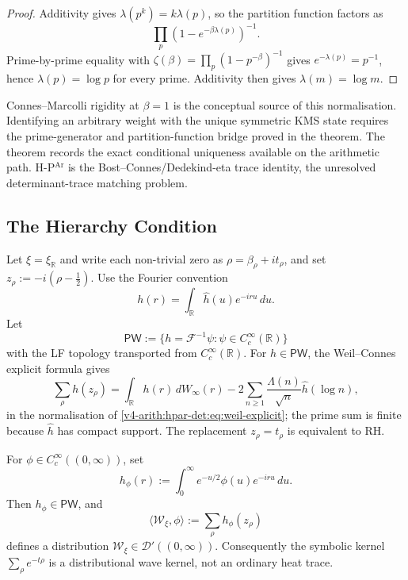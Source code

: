 \begin{proof}
Additivity gives \(\lambda(p^{k})=k\lambda(p)\), so the partition
function factors as
\[
 \prod_{p}(1-e^{-\beta\lambda(p)})^{-1}.
\]
Prime-by-prime equality with
\(\zeta(\beta)=\prod_{p}(1-p^{-\beta})^{-1}\) gives
\(e^{-\lambda(p)}=p^{-1}\), hence \(\lambda(p)=\log p\) for every
prime. Additivity then gives \(\lambda(m)=\log m\).
\end{proof}

\begin{remark}
\label{v4-arith:hpar-det:rem:conditional-uniqueness}
Connes--Marcolli rigidity at \(\beta=1\) is the conceptual source of
this normalisation. Identifying an arbitrary weight with the unique
symmetric KMS state requires the prime-generator and partition-function
bridge proved in the theorem. The theorem records the exact conditional
uniqueness available on the arithmetic path. H-P\(^{\mathrm{Ar}}\) is the
Bost--Connes/Dedekind-eta trace identity, the unresolved
determinant-trace matching problem.
\end{remark}

\subsection{The Hierarchy Condition}
\label{v4-arith:hpar-det:hierarchy}

\begin{lemma}
\label{v4-arith:hpar-det:lem:PW-wave-regularisation}
Let \(\xi=\xi_{\mathbb R}\) and write each
non-trivial zero as \(\rho=\beta_{\rho}+it_{\rho}\), and set
\(z_{\rho}:=-i(\rho-\tfrac12)\). Use the Fourier
convention
\[
h(r)=\int_{\mathbb R}\widehat h(u)e^{-iru}\,du .
\]
Let
\[
\mathsf{PW}:=\{h=\mathcal F^{-1}\psi:\psi\in C_c^\infty(\mathbb R)\}
\]
with the LF topology transported from \(C_c^\infty(\mathbb R)\). For
\(h\in\mathsf{PW}\), the Weil--Connes explicit formula gives
\begin{equation}
\label{v4-arith:hpar-det:eq:PW-weil}
\sum_{\rho}h(z_{\rho})
=\int_{\mathbb R}h(r)\,dW_{\infty}(r)
-2\sum_{n\geq1}\frac{\Lambda(n)}{\sqrt n}\widehat h(\log n),
\end{equation}
in the normalisation of \eqref{v4-arith:hpar-det:eq:weil-explicit};
the prime sum is finite because \(\widehat h\) has compact support.
The replacement \(z_{\rho}=t_{\rho}\) is equivalent to RH.

For \(\phi\in C_c^\infty((0,\infty))\), set
\[
h_{\phi}(r):=\int_0^\infty e^{-u/2}\phi(u)e^{-iru}\,du .
\]
Then \(h_{\phi}\in\mathsf{PW}\), and
\[
\langle\mathcal W_{\xi},\phi\rangle
:=\sum_{\rho}h_{\phi}(z_{\rho})
\]
defines a distribution \(\mathcal W_{\xi}\in\mathcal D'((0,\infty))\).
Consequently the symbolic kernel \(\sum_{\rho}e^{-t\rho}\) is a
distributional wave kernel, not an ordinary heat trace.
\end{lemma}

